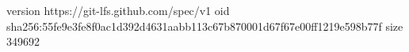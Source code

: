 version https://git-lfs.github.com/spec/v1
oid sha256:55fe9e3fe8f0ac1d392d4631aabb113c67b870001d67f67e00ff1219e598b77f
size 349692
